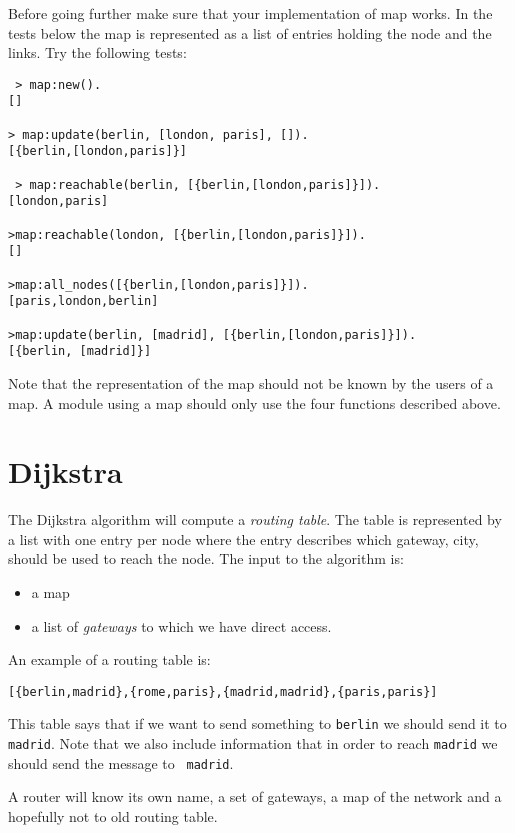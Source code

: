 \documentclass[a4paper, 11pt]{article}
\begin{document}
\noindent Before going further make sure that your implementation of map
works. In the tests below the map is represented as a list of entries
holding the node and the links. Try the following tests:

\begin{verbatim}
 > map:new().
[]

> map:update(berlin, [london, paris], []).
[{berlin,[london,paris]}]

 > map:reachable(berlin, [{berlin,[london,paris]}]).
[london,paris]

>map:reachable(london, [{berlin,[london,paris]}]).
[]

>map:all_nodes([{berlin,[london,paris]}]).
[paris,london,berlin]

>map:update(berlin, [madrid], [{berlin,[london,paris]}]).
[{berlin, [madrid]}]
\end{verbatim}

\noindent Note that the representation of the map should not be known
by the users of a map. A module using a map should only use the four
functions described above.

\section{Dijkstra}

The Dijkstra algorithm will compute a {\em routing table}. The table
is represented by a list with one entry per node where the entry
describes which gateway, city,  should be used to reach the node. The input to
the algorithm is: 
\begin{itemize}
\item a map 
\item a list of {\em gateways} to which we have direct access.
\end{itemize}

An example of a routing table is:

\begin{verbatim}
[{berlin,madrid},{rome,paris},{madrid,madrid},{paris,paris}]
\end{verbatim}

This table says that if we want to send something to {\tt berlin} we
should send it to {\tt madrid}. Note that we also include information
that in order to reach {\tt madrid} we should send the message to {\tt
  madrid}.

\noindent A router will know its own name, a set of gateways, a map
of the network and a hopefully not to old routing table.
\end{document}
